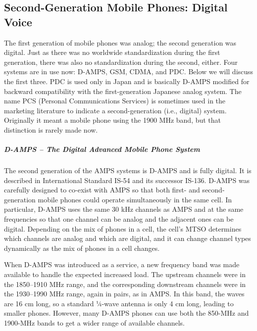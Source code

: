 \protect\hypertarget{0130661023_ch02lev1sec6.htmlux5cux23ch02lev2sec23}{}{}

\subsection{Second-Generation Mobile Phones: Digital Voice}

The first generation of mobile phones was analog; the second generation
was digital. Just as there was no worldwide standardization during the
first generation, there was also no standardization during the second,
either. Four systems are in use now: D-AMPS, GSM, CDMA, and PDC. Below
we will discuss the first three. PDC is used only in Japan and is
basically D-AMPS modified for backward compatibility with the
first-generation Japanese analog system. The name {PCS} ({Personal
Communications Services}) is sometimes used in the marketing literature
to indicate a second-generation (i.e., digital) system. Originally it
meant a mobile phone using the 1900 MHz band, but that distinction is
rarely made now.

\protect\hypertarget{0130661023_ch02lev1sec6.htmlux5cux23ch02lev3sec22}{}{}

\subparagraph{D-AMPS -- The Digital Advanced Mobile Phone System}

The second generation of the AMPS systems is {D-AMPS} and is fully
digital. It is described in International Standard IS-54 and its
successor IS-136. D-AMPS was carefully designed to co-exist with AMPS so
that both first- and second-generation mobile phones could operate
simultaneously in the same cell. In particular, D-AMPS uses the same 30
kHz channels as AMPS and at the same frequencies so that one channel can
be analog and the adjacent ones can be digital. Depending on the mix of
phones in a cell, the cell's MTSO determines which channels are analog
and which are digital, and it can change channel types dynamically as
the mix of phones in a cell changes.

When D-AMPS was introduced as a service, a new frequency band was made
available to handle the expected increased load. The upstream channels
were in the 1850--1910 MHz range, and the corresponding downstream
channels were in the 1930--1990 MHz range, again in pairs, as in AMPS.
In this band, the waves are 16 cm long, so a standard ¼-wave antenna is
only 4 cm long, leading to smaller phones. However, many D-AMPS phones
can use both the 850-MHz and 1900-MHz bands to get a wider range of
available channels.

